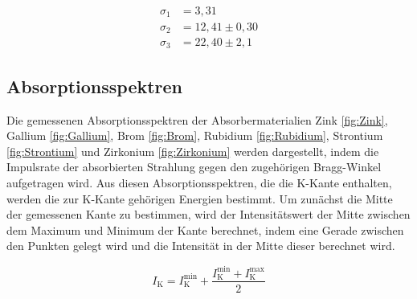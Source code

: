 \documentclass[titlepage = firstcover]{scrartcl}
\begin{document}
            \begin{align*}
              \sigma_1 &= 3,31 \\
              \sigma_2 &= 12,41 \pm 0,30 \\
              \sigma_3 &= 22,40 \pm 2,1
            \end{align*}
            \noindent

          
          \subsection{Absorptionsspektren}
            Die gemessenen Absorptionsspektren der Absorbermaterialien Zink \ref{fig:Zink}, Gallium \ref{fig:Gallium}, Brom \ref{fig:Brom}, Rubidium \ref{fig:Rubidium}, Strontium \ref{fig:Strontium}
            und Zirkonium \ref{fig:Zirkonium} werden dargestellt, indem die Impulsrate der absorbierten Strahlung gegen den zugehörigen Bragg-Winkel aufgetragen wird. 
            Aus diesen Absorptionsspektren, die die K-Kante enthalten, werden die zur K-Kante gehörigen Energien bestimmt. Um zunächst die Mitte der gemessenen Kante zu bestimmen, wird 
            der Intensitätswert der Mitte zwischen dem Maximum und Minimum der Kante berechnet, indem eine Gerade zwischen den Punkten gelegt wird und die Intensität in der Mitte dieser berechnet
            wird.
            
            \begin{equation}
              I_{\text{K}} = I_{\text{K}}^{\text{min}} + \frac{I_{\text{K}}^{\text{min}} + I_{\text{K}}^{\text{max}}}{2}
              \label{eqn:EFehler}
            \end{equation}
\end{document}
